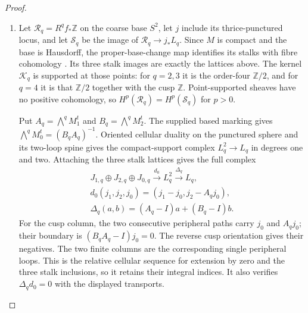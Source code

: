 \documentclass[11pt,a4paper]{article}
\theoremstyle{definition}
\begin{document}
\begin{proof}
\begin{enumerate}[label=\arabic*.]
\item Let $\mathcal R_q=R^qf_*\mathbb Z$ on the coarse base $S^2$,
let $j$ include its thrice-punctured locus, and let $\mathcal S_q$
be the image of $\mathcal R_q\to j_*L_q$.
Since $M$ is compact and the base is Hausdorff, the proper-base-change
map identifies its stalks with fibre cohomology
\cite[Tag 09V5, Lemma 20.18.1; chapter PDF p.~30]{StacksProject}.
Its three stalk images are exactly the lattices above.  The kernel
$\mathcal K_q$ is supported at those points: for $q=2,3$ it is the
order-four $\mathbb Z/2$, and for $q=4$ it is that $\mathbb Z/2$
together with the cusp $\mathbb Z$.
Point-supported sheaves have no positive cohomology, so
$H^p(\mathcal R_q)=H^p(\mathcal S_q)$ for $p>0$.

Put $A_q=\bigwedge^qM_1^t$ and $B_q=\bigwedge^qM_2^t$.
The supplied based marking gives
$\bigwedge^qM_0^t=(B_qA_q)^{-1}$.
Oriented cellular duality on the punctured sphere and its two-loop
spine gives the compact-support complex $L_q^2\to L_q$ in degrees
one and two.  Attaching the three stalk lattices gives the full complex
\[
\begin{gathered}
 J_{1,q}\oplus J_{2,q}\oplus J_{0,q}
 \xrightarrow{d_0}L_q^2\xrightarrow{\Delta_q}L_q,\\
 d_0(j_1,j_2,j_0)=(j_1-j_0,j_2-A_qj_0),\\
 \Delta_q(a,b)=(A_q-I)a+(B_q-I)b.
\end{gathered}
\]
For the cusp column, the two consecutive peripheral paths carry
$j_0$ and $A_qj_0$; their boundary is
$(B_qA_q-I)j_0=0$.  The reverse cusp orientation gives their negatives.
The two finite columns are the corresponding single peripheral
loops.  This is the relative cellular sequence for extension by zero
and the three stalk inclusions, so it retains their integral indices.
It also verifies $\Delta_qd_0=0$ with the displayed transports.


\end{enumerate}
\end{proof}
\end{document}
